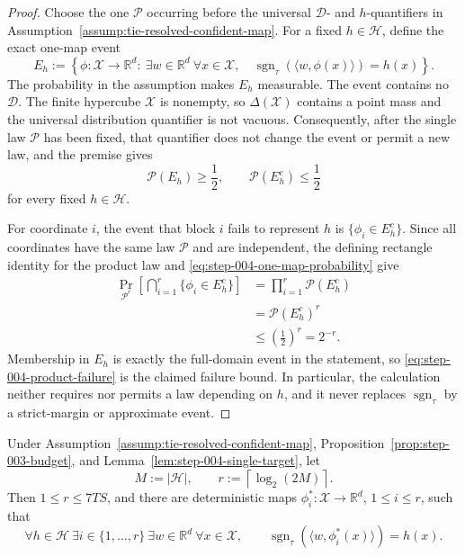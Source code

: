 \begin{proof}
Choose the one $\mathcal P$ occurring before the universal $\mathcal D$- and
$h$-quantifiers in Assumption~\ref{assump:tie-resolved-confident-map}.  For a
fixed $h\in\mathcal H$, define the exact one-map event
\begin{equation}
E_h:=\left\{\phi:\mathcal X\to\mathbb R^d:\
\exists w\in\mathbb R^d\ \forall x\in\mathcal X,\quad
\operatorname{sgn}_{\tau}(\langle w,\phi(x)\rangle)=h(x)\right\}.
\label{eq:step-004-success-event}
\end{equation}
The probability in the assumption makes $E_h$ measurable.  The event contains
no $\mathcal D$.  The finite hypercube $\mathcal X$ is nonempty, so
$\Delta(\mathcal X)$ contains a point mass and the universal distribution
quantifier is not vacuous.  Consequently, after the single law $\mathcal P$
has been fixed, that quantifier does not change the event or permit a new law,
and the premise gives
\begin{equation}
\mathcal P(E_h)\geq\frac12,
\qquad
\mathcal P(E_h^c)\leq\frac12
\label{eq:step-004-one-map-probability}
\end{equation}
for every fixed $h\in\mathcal H$.

For coordinate $i$, the event that block $i$ fails to represent $h$ is
$\{\phi_i\in E_h^c\}$.  Since all coordinates have the same law $\mathcal P$
and are independent, the defining rectangle identity for the product law and
\eqref{eq:step-004-one-map-probability} give
\begin{equation}
\begin{aligned}
\Pr_{\mathcal P^r}\!\left[\bigcap_{i=1}^{r}
\{\phi_i\in E_h^c\}\right]
&=\prod_{i=1}^{r}\mathcal P(E_h^c)\\
&=\mathcal P(E_h^c)^r\\
&\leq\left(\frac12\right)^r=2^{-r}.
\end{aligned}
\label{eq:step-004-product-failure}
\end{equation}
Membership in $E_h$ is exactly the full-domain event in the statement, so
\eqref{eq:step-004-product-failure} is the claimed failure bound.  In
particular, the calculation neither requires nor permits a law depending on
$h$, and it never replaces $\operatorname{sgn}_{\tau}$ by a strict-margin or
approximate event.
\end{proof}

\begin{proposition}
\label{prop:step-004-covering}
Under Assumption~\ref{assump:tie-resolved-confident-map},
Proposition~\ref{prop:step-003-budget}, and
Lemma~\ref{lem:step-004-single-target}, let
\[
M:=|\mathcal H|,
\qquad
r:=\left\lceil\log_2(2M)\right\rceil.
\]
Then $1\leq r\leq7TS$, and there are deterministic maps
$\phi_i^*:\mathcal X\to\mathbb R^d$, $1\leq i\leq r$, such that
\begin{equation}
\forall h\in\mathcal H\ \exists i\in\{1,\ldots,r\}\
\exists w\in\mathbb R^d\ \forall x\in\mathcal X,
\qquad
\operatorname{sgn}_{\tau}(\langle w,\phi_i^*(x)\rangle)=h(x).
\label{eq:step-004-common-cover}
\end{equation}
\end{proposition}


